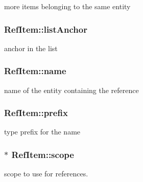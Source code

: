 more items belonging to the same entity 

\hypertarget{struct_ref_item_a06a0f029d92e3573e65f94a2a106b95f}{}
\subsubsection[{list\+Anchor}]{ Ref\+Item\+::list\+Anchor}\label{struct_ref_item_a06a0f029d92e3573e65f94a2a106b95f}


anchor in the list 

\hypertarget{struct_ref_item_a1235c4acaa9aa9bfece34c6d7f654ef0}{}
\subsubsection[{name}]{ Ref\+Item\+::name}\label{struct_ref_item_a1235c4acaa9aa9bfece34c6d7f654ef0}


name of the entity containing the reference 

\hypertarget{struct_ref_item_a5bc1b5fe84242499696ff7414217fd58}{}
\subsubsection[{prefix}]{ Ref\+Item\+::prefix}\label{struct_ref_item_a5bc1b5fe84242499696ff7414217fd58}


type prefix for the name 

\hypertarget{struct_ref_item_a627583db0bcc1f4fb12b8825a5a93670}{}
\subsubsection[{scope}]{$\ast$ Ref\+Item\+::scope}\label{struct_ref_item_a627583db0bcc1f4fb12b8825a5a93670}


scope to use for references. 

\hypertarget{struct_ref_item_a03313f190ccfba8be0bcfbb5dedf6c73}{}
